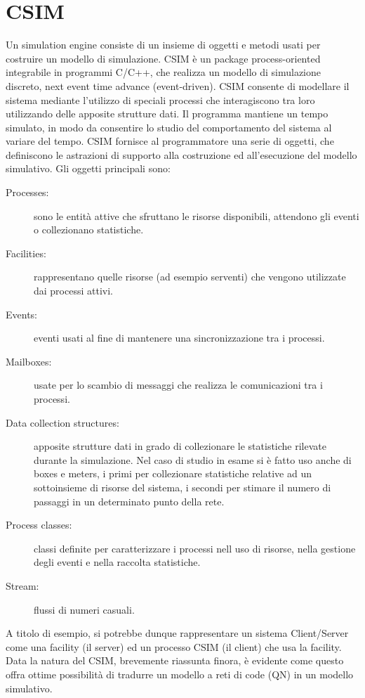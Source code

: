 \section{CSIM}
Un simulation engine consiste di un insieme di oggetti e metodi usati per costruire un modello di simulazione. CSIM è un package process-oriented integrabile in programmi C/C++, che realizza un modello di simulazione discreto, next event time advance (event-driven). CSIM consente di modellare il sistema mediante l’utilizzo di speciali processi che interagiscono tra loro utilizzando delle apposite strutture dati. Il programma mantiene un tempo simulato, in modo da consentire lo studio del comportamento del sistema al variare del tempo. CSIM fornisce al programmatore una serie di oggetti, che definiscono le astrazioni di supporto alla costruzione ed all’esecuzione del modello simulativo. Gli oggetti principali sono:
\begin{description}
	\item[Processes:] sono le entità attive che sfruttano le risorse disponibili, attendono gli eventi o collezionano statistiche.
	\item[Facilities:] rappresentano quelle risorse (ad esempio serventi) che vengono utilizzate dai processi attivi. 
	\item[Events:] eventi usati al fine di mantenere una sincronizzazione tra i processi.
	\item[Mailboxes:] usate per lo scambio di messaggi che realizza le comunicazioni tra i processi. 
	\item[Data collection structures:] apposite strutture dati in grado di collezionare le statistiche rilevate durante la simulazione. Nel caso di studio in esame si è fatto uso anche di boxes e meters, i primi per collezionare statistiche relative ad un sottoinsieme di risorse del sistema, i secondi per stimare il numero di passaggi in un determinato punto della rete.
	\item[Process classes:] classi definite per caratterizzare i processi nell uso di risorse, nella gestione degli eventi e nella raccolta statistiche. 
	\item[Stream:] flussi di numeri casuali. 
\end{description}
A titolo di esempio, si potrebbe dunque rappresentare un sistema Client/Server come una facility (il server) ed un processo CSIM (il client) che usa la facility. Data la natura del CSIM, brevemente riassunta finora, è evidente come questo offra ottime possibilità di tradurre un modello a reti di code (QN) in un modello simulativo.

